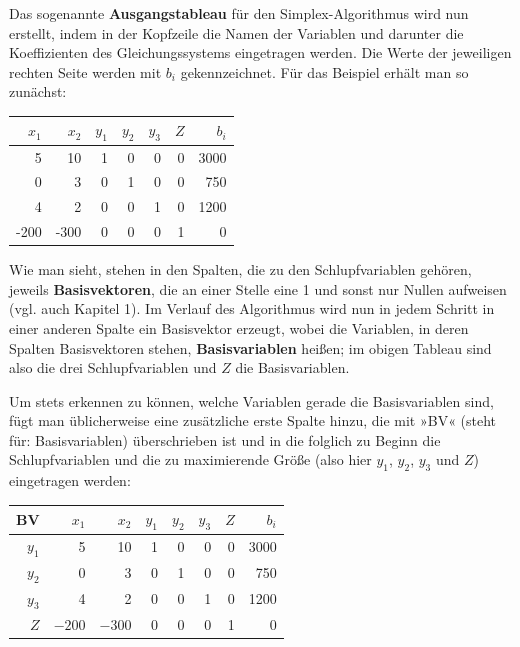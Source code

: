 Das sogenannte \textbf{Ausgangstableau} für den Simplex-Algorithmus wird nun erstellt, indem in der Kopfzeile die Namen der Variablen und darunter die Koeffizienten des Gleichungssystems eingetragen werden. Die Werte der jeweiligen rechten Seite werden mit $b_i$ gekennzeichnet. Für das Beispiel erhält man so zunächst:

\begin{center}
  \begin{tabular}{|r|r|r|r|r|r|r|}
    \hline
    $x_1$ & $x_2$ & $y_1$ & $y_2$ & $y_3$ & $Z$ & $b_i$\\
    \hline
    5 & 10 & 1 & 0 & 0 & 0 & 3000\\
    0 & 3 & 0 & 1 & 0 & 0 & 750\\
    4 & 2 & 0 & 0 & 1 & 0 & 1200\\
    -200 & -300 & 0 & 0 & 0 & 1 & 0\\
    \hline
  \end{tabular}
\end{center}

Wie man sieht, stehen in den Spalten, die zu den Schlupfvariablen gehören, jeweils \textbf{Basisvektoren}, die an einer Stelle eine 1 und sonst nur Nullen aufweisen (vgl. auch Kapitel 1). Im Verlauf des Algorithmus wird nun in jedem Schritt in einer anderen Spalte ein Basisvektor erzeugt, wobei die Variablen, in deren Spalten Basisvektoren stehen, \textbf{Basisvariablen} heißen; im obigen Tableau sind also die drei Schlupfvariablen und $Z$ die Basisvariablen.

Um stets erkennen zu können, welche Variablen gerade die Basisvariablen sind, fügt man üblicherweise eine zusätzliche erste Spalte hinzu, die mit »BV« (steht für: Basisvariablen) überschrieben ist und in die folglich zu Beginn die Schlupfvariablen und die zu maximierende Größe (also hier $y_1$, $y_2$, $y_3$ und $Z$) eingetragen werden:

\begin{center}
  \begin{tabular}{|r|r|r|r|r|r|r|r|}
    \hline
    BV & $x_1$ & $x_2$ & $y_1$ & $y_2$ & $y_3$ & $Z$ & $b_i$\\
    \hline
    $y_1$ & 5 & 10 & 1 & 0 & 0 & 0 & 3000\\
    $y_2$ & 0 & 3 & 0 & 1 & 0 & 0 & 750\\
    $y_3$ & 4 & 2 & 0 & 0 & 1 & 0 & 1200\\
    $Z$ & $-200$ & $-300$ & 0 & 0 & 0 & 1 & 0\\
    \hline
  \end{tabular}
\end{center}

